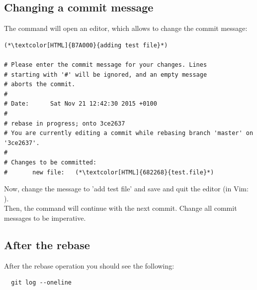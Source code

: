 \subsection{Changing a commit message}
\begin{frame}[fragile]
  \subslidetitle

  The  command will open an editor, which allows to change the commit message:
  \begin{lstlisting}
(*\textcolor[HTML]{B7A000}{adding test file}*)

# Please enter the commit message for your changes. Lines
# starting with '#' will be ignored, and an empty message
# aborts the commit.
#
# Date:      Sat Nov 21 12:42:30 2015 +0100
#
# rebase in progress; onto 3ce2637
# You are currently editing a commit while rebasing branch 'master' on '3ce2637'.
#
# Changes to be committed:
#       new file:   (*\textcolor[HTML]{682268}{test.file}*)
\end{lstlisting}

  Now, change the message to 'add test file' and save and quit the editor (in Vim: ).
  \\
  \vspace{1em}
  Then, the  command will continue with the next commit. Change all commit
  messages to be imperative.
\end{frame}

\subsection{After the rebase}
\begin{frame}[fragile]
  \subslidetitle

   After the rebase operation you should see the following:
  \begin{lstlisting}
  git log --oneline
\end{lstlisting}
\end{frame}

